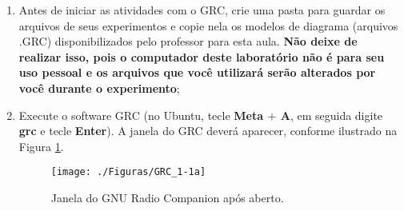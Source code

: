 \documentclass[12pt,addpoints]{exam}
\begin{document}
\begin{enumerate}
    \item Antes de iniciar as atividades com o GRC, crie uma pasta para guardar os arquivos de seus experimentos e copie nela os modelos de diagrama (arquivos .GRC) disponibilizados pelo professor para esta aula. \textbf{Não deixe de realizar isso, pois o computador deste laboratório não é para seu uso pessoal e os arquivos que você utilizará serão alterados por você durante o experimento};
    \item Execute o software GRC (no Ubuntu, tecle \textbf{Meta $+$ A}, em seguida digite \textbf{grc} e tecle \textbf{Enter}). A janela do GRC deverá aparecer, conforme ilustrado na Figura \ref{fig:GRC_1-1a}.
    \begin{figure}[htb]
        \centering
        \texttt{[image: ./Figuras/GRC\_1-1a]} \\
        \caption{Janela do GNU Radio Companion após aberto.}
        \label{fig:GRC_1-1a}
    \end{figure}


\end{enumerate}
\end{document}
